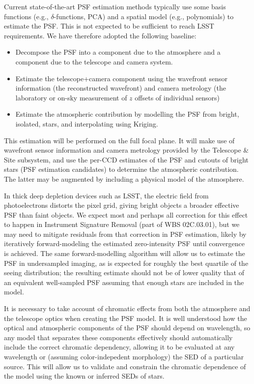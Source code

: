 \documentclass[12pt]{article}
\newcommand{\wbsSFM}{WBS 02C.03.01}
\begin{document}
Current state-of-the-art PSF estimation methods typically use some basis functions (e.g., $\delta$-functions, PCA) and a spatial model (e.g., polynomials) to estimate the PSF\@. This is not expected to be sufficient to reach LSST requirements. We have therefore adopted the following baseline:
\begin{itemize}
    \item Decompose the PSF into a component due to the atmosphere and a component due to the telescope and camera system.
    \item Estimate the telescope+camera component using the wavefront sensor information (the reconstructed wavefront) and camera metrology (the laboratory or on-sky measurement of $z$ offsets of individual sensors)
    \item Estimate the atmospheric contribution by modelling the PSF from bright, isolated, stars, and interpolating using Kriging. %
\end{itemize}

This estimation will be performed on the full focal plane. It will make use of wavefront sensor information and camera metrology provided by the Telescope \& Site subsystem, and use the per-CCD estimates of the PSF and cutouts of bright stars (PSF estimation candidates) to determine the atmospheric contribution. The latter may be augmented by including a physical model of the atmosphere.

In thick deep depletion devices such as LSST, the electric field from photoelectrons distorts the pixel grid, giving bright objects a broader effective PSF than faint objects.  We expect most and perhaps all correction for this effect to happen in Instrument Signature Removal (part of \wbsSFM), but we may need to mitigate residuals from that correction in PSF estimation, likely by iteratively forward-modeling the estimated zero-intensity PSF until convergence is achieved. The same forward-modelling algorithm will allow us to estimate the PSF in undersampled imaging, as is expected for roughly the best quartile of the seeing distribution; the resulting estimate should not be of lower quality that of an equivalent well-sampled PSF assuming that enough stars are included in the model.

It is necessary to take account of chromatic effects from both the atmosphere and the telescope optics when creating the PSF model. It is well understood how the optical and atmospheric components of the PSF should depend on wavelength, so any model that separates these components effectively should automatically include the correct chromatic dependency, allowing it to be evaluated at any wavelength or (assuming color-indepedent morphology) the SED of a particular source.  This will allow us to validate and constrain the chromatic dependence of the model using the known or inferred SEDs of stars.
\end{document}
